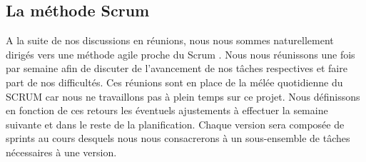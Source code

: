 \subsection{La méthode Scrum}
	\label{sec:gestion}


A la suite de nos discussions en réunions, nous nous sommes naturellement dirigés vers une méthode agile proche du \og Scrum \fg. Nous nous réunissons une fois par semaine afin de discuter de l'avancement de nos tâches respectives et faire part de nos difficultés. Ces réunions sont en place de la mélée quotidienne du SCRUM car nous ne travaillons pas à plein temps sur ce projet. Nous définissons en fonction de ces retours les éventuels ajustements à effectuer la semaine suivante et dans le reste de la planification. 
	Chaque version sera composée de sprints au cours desquels nous nous consacrerons à un sous-ensemble de tâches nécessaires à une version. %
	
